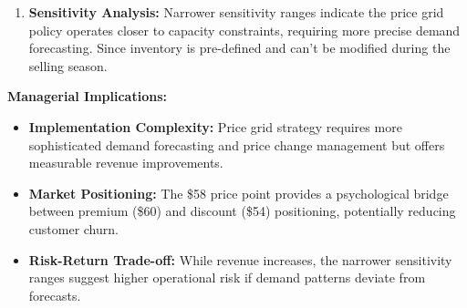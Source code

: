 \documentclass[12pt]{article}
\begin{document}
\begin{enumerate}[label= (\alph*), leftmargin=2em]
\begin{enumerate}[nosep]
\item \textbf{Sensitivity Analysis:} Narrower sensitivity ranges indicate the price grid policy operates closer to capacity constraints, requiring more precise demand forecasting. Since inventory is pre-defined and can't be modified during the selling season.
\end{enumerate}

\textbf{Managerial Implications:}

\begin{itemize}[nosep]
\item \textbf{Implementation Complexity:} Price grid strategy requires more sophisticated demand forecasting and price change management but offers measurable revenue improvements.
\item \textbf{Market Positioning:} The \$58 price point provides a psychological bridge between premium (\$60) and discount (\$54) positioning, potentially reducing customer churn.
\item \textbf{Risk-Return Trade-off:} While revenue increases, the narrower sensitivity ranges suggest higher operational risk if demand patterns deviate from forecasts.
\end{itemize}
\end{enumerate}
\end{document}
